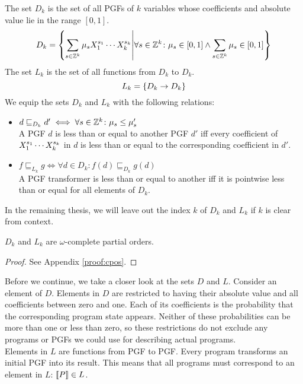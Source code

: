 \begin{definition}
	The set $D_k$ is the set of all PGFs of $k$ variables whose coefficients and absolute value lie in the range $[0, 1]$.
	\[ D_k = \left\{ \sum_{s \in \mathbb{Z}^k} \mu_s X_1^{s_1} \cdots X_k^{s_k} \middle|
		\forall s \in \mathbb{Z}^k \colon \mu_s \in [0, 1]
		\land \sum_{s \in \mathbb{Z}^k} \mu_s \in [0,1] \right\} \]
	The set $L_k$ is the set of all functions from $D_k$ to $D_k$.
	\[ L_k = \left\{ D_k \to D_k \right\} \]
We equip the sets $D_k$ and $L_k$ with the following relations:
\begin{itemize}
	\item $d \sqsubseteq_{D_k} d' \iff \forall s \in \mathbb{Z}^k \colon \mu_s \leq \mu_s'$ \\
		A PGF $d$ is less than or equal to another PGF $d'$ iff every coefficient of $X_1^{s_1} \cdots X_k^{s_k}$ in $d$ is less than or equal to the corresponding coefficient in $d'$.
	\item $f \sqsubseteq_{L_k} g \iff \forall d \in D_k \colon f(d) \sqsubseteq_{D_k} g(d)$ \\
		A PGF transformer is less than or equal to another iff it is pointwise less than or equal for all elements of $D_k$.
\end{itemize}
\end{definition}
In the remaining thesis, we will leave out the index $k$ of $D_k$ and $L_k$ if $k$ is clear from context.

\begin{lemma}[label=lem:ext:cpos]
	$D_k$ and $L_k$ are $\omega$-complete partial orders.
	\begin{proof}
		See Appendix \ref{proof:cpos}.
	\end{proof}
\end{lemma}
Before we continue, we take a closer look at the sets $D$ and $L$.
Consider an element of $D$.
Elements in $D$ are restricted to having their absolute value and all coefficients between zero and one.
Each of its coefficients is the probability that the corresponding program state appears.
Neither of these probabilities can be more than one or less than zero, so these restrictions do not exclude any programs or PGFs we could use for describing actual programs. \\
Elements in $L$ are functions from PGF to PGF.
Every program transforms an initial PGF into its result.
This means that all programs must correspond to an element in $L$: $\left\llbracket P \right\rrbracket \in L$.

